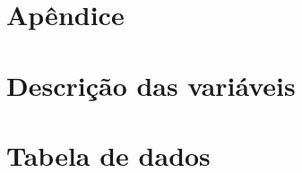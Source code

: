 

\section*{Apêndice}

\begin{appendices}

\section{Descrição das variáveis} \label{ap:a}

\lipsum[1]



\section{Tabela de dados} \label{ap:b}

\lipsum[1]



\end{appendices}


